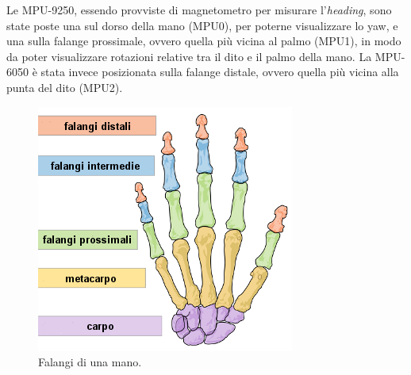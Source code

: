 Le MPU-9250, essendo provviste di magnetometro per misurare l'\textit{heading}, sono state poste una sul dorso della mano (MPU0), per poterne visualizzare lo yaw, e una sulla falange prossimale, ovvero quella più vicina al palmo (MPU1), in modo da poter visualizzare rotazioni relative tra il dito e il palmo della mano. La MPU-6050 è stata invece posizionata sulla falange distale, ovvero quella più vicina alla punta del dito (MPU2).\\

\begin{figure}[H]
    \includegraphics[scale=0.45]{immagini/falangi.png}
    \centering
    \caption{Falangi di una mano.}
\end{figure}

\clearpage